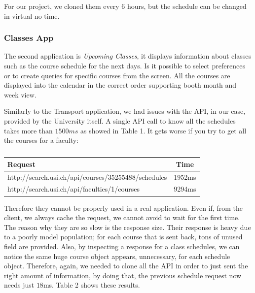 \documentclass[]{usiinfbachelorproject}
\begin{document}
For our project, we cloned them every 6 hours, but the schedule can be changed in virtual no time.

\subsubsection{Classes App}
The second application is \emph{Upcoming Classes}, it displays information about classes such as the course schedule for the next days. Is it possible to select preferences or to create queries for specific courses from the screen. All the courses are displayed into the calendar in the correct order supporting booth month and week view.

Similarly to the Transport application, we had issues with the API, in our case, provided by the University itself.
A single API call to know all the schedules takes more than $1500ms$ as showed in Table 1. It gets worse if you try to get all the courses for a faculty:
\begin{table}[h]
\centering
\begin{tabular}{|l|c|}
\hline
Request & Time \\\hline
http://search.usi.ch/api/courses/35255488/schedules & 1952ms \\
http://search.usi.ch/api/faculties/1/courses & 9294ms\\\hline
\end{tabular}
\caption{}
\label{table:usi_request}
\end{table}

Therefore they cannot be properly used in a real application. Even if, from the client, we always cache the request, we cannot avoid to wait for the first time. The reason why they are so slow is the response size. Their response is heavy due to a poorly model population; for each course that is sent back, tons of unused field are provided. Also, by inspecting a response for a class schedules, we can notice the same huge course object appears, unnecessary, for each schedule object.
Therefore, again, we needed to clone all the API in order to just sent the right amount of information, by doing that, the previous schedule request now needs just $18$ms. Table 2 shows these results.
\end{document}
